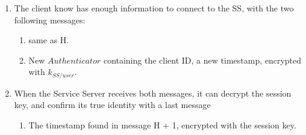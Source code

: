 \begin{enumerate}
	\item The client know has enough information to connect to the SS, with the two following messages:
	\begin{enumerate}[label=\bfseries\Alph*), resume]
		\item same as H.
		\item New $Authenticator$ containing the client ID, a new timestamp, encrypted with $k_{SS/user}$.
	\end{enumerate}
	
	\item When the Service Server receives both messages, it can decrypt the session key, and confirm its true identity with a last message
	\begin{enumerate}[label=\bfseries\Alph*), resume]
		\item The timestamp found in message H + 1, encrypted with the session key.
	\end{enumerate}
\end{enumerate}